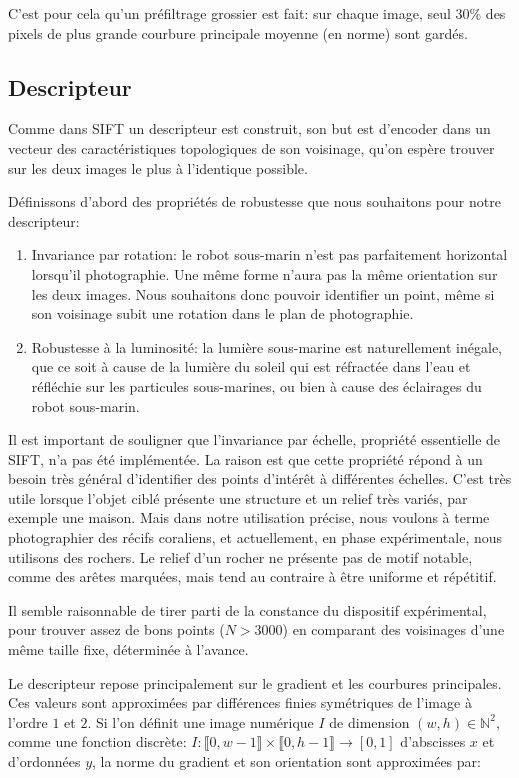 \documentclass[
	a4paper, %
	10pt, %
	unnumberedsections, %
	twoside, %
]{LTJournalArticle}
\begin{document}
C'est pour cela qu'un préfiltrage grossier est fait: sur chaque image,
seul $30 \%$ des pixels de plus grande courbure principale moyenne (en norme)
sont gardés.

\subsection{Descripteur}
Comme dans SIFT un descripteur est construit,
son but est d'encoder dans un vecteur des caractéristiques topologiques de son voisinage, qu'on espère trouver
sur les deux images le plus à l'identique possible.

Définissons d'abord des propriétés de robustesse
que nous souhaitons pour notre descripteur:

\begin{enumerate}
	\item Invariance par rotation: le robot sous-marin n'est pas parfaitement
	      horizontal lorsqu'il photographie. Une même forme n'aura pas la même
	      orientation sur les deux images. Nous souhaitons donc pouvoir identifier un
	      point, même si son voisinage subit une rotation dans le plan de photographie.
	\item Robustesse à la luminosité: la lumière sous-marine est naturellement inégale,
	      que ce soit à cause de la lumière du soleil qui est réfractée dans l'eau
	      et réfléchie sur les particules sous-marines, ou bien à
	      cause des éclairages du robot sous-marin.
\end{enumerate}

Il est important de souligner que l'invariance par échelle, propriété essentielle de SIFT,
n'a pas été implémentée. La raison est que cette propriété
répond à un besoin très général d'identifier des points d'intérêt à différentes
échelles. C'est très utile lorsque l'objet ciblé présente une structure et
un relief très variés, par exemple une maison. Mais dans notre utilisation précise,
nous voulons à terme photographier des récifs coraliens, et actuellement, en
phase expérimentale, nous utilisons des rochers. Le relief d'un rocher ne présente
pas de motif notable, comme des arêtes marquées, mais tend au contraire à être
uniforme et répétitif.

Il semble raisonnable de tirer parti de la
constance du dispositif expérimental, pour trouver assez de bons points ($N > 3000$)
en comparant des voisinages d'une même taille fixe, déterminée à l'avance.


Le descripteur repose principalement sur le gradient et les courbures principales.
Ces valeurs sont approximées par différences finies symétriques de l'image à l'ordre $1$ et $2$.
Si l'on définit une image numérique $I$ de dimension $(w, h) \in \mathbb{N}^2$,
comme une fonction discrète:
$I: \llbracket 0, w-1 \rrbracket \times \llbracket 0, h-1 \rrbracket \rightarrow [0, 1]$
d'abscisses $x$ et d'ordonnées $y$, la norme du gradient
et son orientation sont approximées par:
\end{document}
